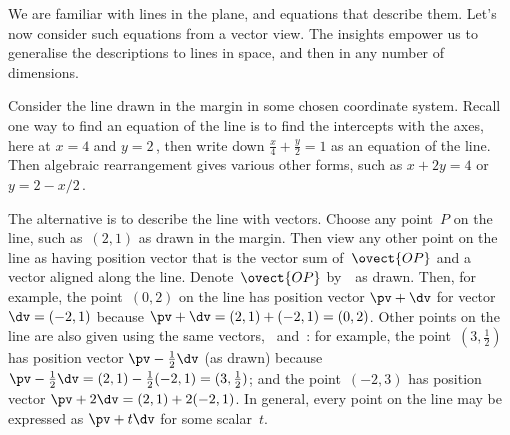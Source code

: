 We are familiar with lines in the plane, and equations that describe them. 
Let's now consider such equations from a vector view.
The insights empower us to generalise the descriptions to lines in space, and then in any number of dimensions.

\begin{example} \label{eg:}
Consider the line drawn in the margin in some chosen coordinate system.
Recall one way to find an equation of the line is to find the intercepts with the axes, here at \(x=4\) and \(y=2\)\,, then write down \(\frac x4+\frac y2=1\) as an equation of the line.
%
Then algebraic rearrangement gives various other forms, such as \(x+2y=4\) or \(y=2-x/2\)\,.

The alternative is to describe the line with vectors.
Choose any point~\(P\) on the line, such as~\((2,1)\) as drawn in the margin.
Then view any other point on the line as having position vector that is the vector sum of~\(\ovect{OP}\) and a vector aligned along the line.
Denote~\(\ovect{OP}\) by~\pv\ as drawn.
Then, for example, the point~\((0,2)\) on the line has position vector  \(\pv+\dv\) for vector \(\dv=(-2,1)\) because \(\pv+\dv=(2,1)+(-2,1)=(0,2)\).
%
Other points on the line are also given using the same vectors, \pv\ and~\dv: for example, the point~\((3,\tfrac12)\) has position vector \(\pv-\tfrac12\dv\) (as drawn) because \(\pv-\tfrac12\dv=(2,1)-\tfrac12(-2,1)=(3,\tfrac12)\); and the point~\((-2,3)\) has position vector \(\pv+2\dv=(2,1)+2(-2,1)\).
In general, every point on the line may be expressed as \(\pv+t\dv\) for some scalar~\(t\).


\end{example}
